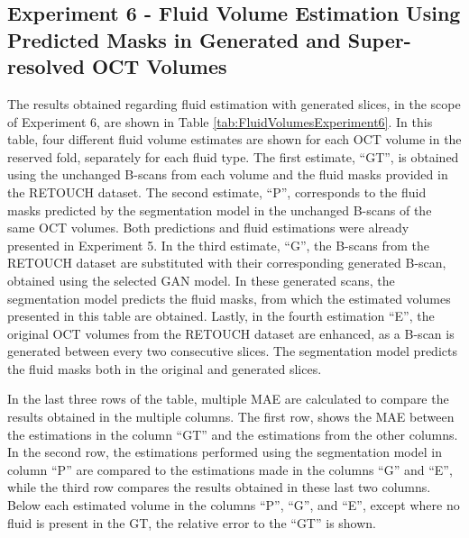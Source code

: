 \subsection{Experiment 6 - Fluid Volume Estimation Using Predicted Masks in Generated and Super-resolved OCT Volumes}

The results obtained regarding fluid estimation with generated slices, in the scope of Experiment 6, are shown in Table  \ref{tab:FluidVolumesExperiment6}. In this table, four different fluid volume estimates are shown for each OCT volume in the reserved fold, separately for each fluid type. The first estimate, ``GT'', is obtained using the unchanged B-scans from each volume and the fluid masks provided in the RETOUCH dataset. The second estimate, ``P'', corresponds to the fluid masks predicted by the segmentation model in the unchanged B-scans of the same OCT volumes. Both predictions and fluid estimations were already presented in Experiment 5. In the third estimate, ``G'', the B-scans from the RETOUCH dataset are substituted with their corresponding generated B-scan, obtained using the selected GAN model. In these generated scans, the segmentation model predicts the fluid masks, from which the estimated volumes presented in this table are obtained. Lastly, in the fourth estimation ``E'', the original OCT volumes from the RETOUCH dataset are enhanced, as a B-scan is generated between every two consecutive slices. The segmentation model predicts the fluid masks both in the original and generated slices.
\par
In the last three rows of the table, multiple MAE are calculated to compare the results obtained in the multiple columns. The first row, shows the MAE between the estimations in the column ``GT'' and the estimations from the other columns. In the second row, the estimations performed using the segmentation model in column ``P'' are compared to the estimations made in the columns ``G'' and ``E'', while the third row compares the results obtained in these last two columns. Below each estimated volume in the columns ``P'', ``G'', and ``E'', except where no fluid is present in the GT, the relative error to the ``GT'' is shown.

